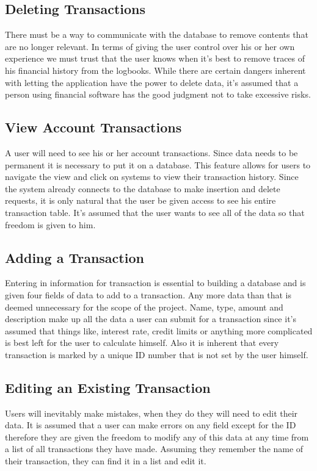 \documentclass[12pt]{article}
\begin{document}
\subsection{Deleting Transactions}
	There must be a way to communicate with the database to remove contents that are no longer relevant. In terms of giving the user control over his or her own experience we must trust that the user knows when it's best to remove traces of his financial history from the logbooks. While there are certain dangers inherent with letting the application have the power to delete data, it's assumed that a person using financial software has the good judgment not to take excessive risks.
\subsection{View Account Transactions}
	A user will need to see his or her account transactions. Since data needs to be permanent it is necessary to put it on a database. This feature allows for users to navigate the view and click on systems to view their transaction history. Since the system already connects to the database to make insertion and delete requests, it is only natural that the user be given access to see his entire transaction table. It's assumed that the user wants to see all of the data so that freedom is given to him.
\subsection{Adding a Transaction}
	Entering in information for transaction is essential to building a database and is given four fields of data to add to a transaction. Any more data than that is deemed unnecessary for the scope of the project. Name, type, amount and description make up all the data a user can submit for a transaction since it's assumed that things like, interest rate, credit limits or anything more complicated is best left for the user to calculate himself. Also it is inherent that every transaction is marked by a unique ID number that is not set by the user himself.
\subsection{Editing an Existing Transaction}
	Users will inevitably make mistakes, when they do they will need to edit their data. It is assumed that a user can make errors on any field except for the ID therefore they are given the freedom to modify any of this data at any time from a list of all transactions they have made. Assuming they remember the name of their transaction, they can find it in a list and edit it. 
\end{document}
